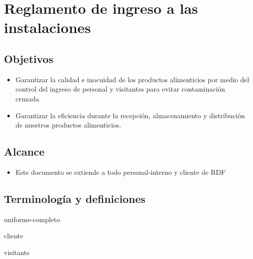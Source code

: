 \renewcommand{\MayorVer}{2}
\renewcommand{\MenorVer}{1}
\renewcommand{\Codigo}{BPD-4-CI/CE}
\renewcommand{\FechaPub}{2023--01}
\renewcommand{\Titulo}{Reglamento de ingreso a las instalaciones}

\section{\Titulo}

\subsection{Objetivos}
\begin{itemize}
	\item Garantizar la calidad e inocuidad de los productos alimenticios por medio del control del ingreso de personal y visitantes para evitar contaminación cruzada.
	\item Garantizar la eficiencia durante la recepción, almacenamiento y distribución de nuestros productos alimenticios.
\end{itemize}

\noindent
\subsection{Alcance}
\begin{itemize}	
	\item Este documento se extiende a todo \gls{personal-interno} y \gls{cliente} de \gls{RDF}
\end{itemize}

\subsection{Terminología y definiciones}

\begin{description}
	\item[\gls{uniforme-completo}] \glsdesc{uniforme-completo}
	\item[\gls{cliente}] \glsdesc{cliente}
	\item[\gls{visitante}] \glsdesc{visitante}  
\end{description}

